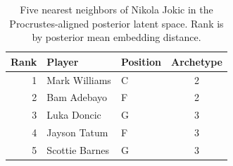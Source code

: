 \begin{table}[htbp]
  \centering\small
  \begin{tabular}{rllc}
    \toprule
    Rank & Player & Position & Archetype \\
    \midrule
    1 & Mark Williams & C & 2 \\
    2 & Bam Adebayo & F & 2 \\
    3 & Luka Doncic & G & 3 \\
    4 & Jayson Tatum & F & 3 \\
    5 & Scottie Barnes & G & 3 \\
    \bottomrule
  \end{tabular}
  \caption{Five nearest neighbors of Nikola Jokic in the Procrustes-aligned posterior latent space. Rank is by posterior mean embedding distance.}
  \label{tab:Nikola_Jokic_neighbors}
\end{table}

